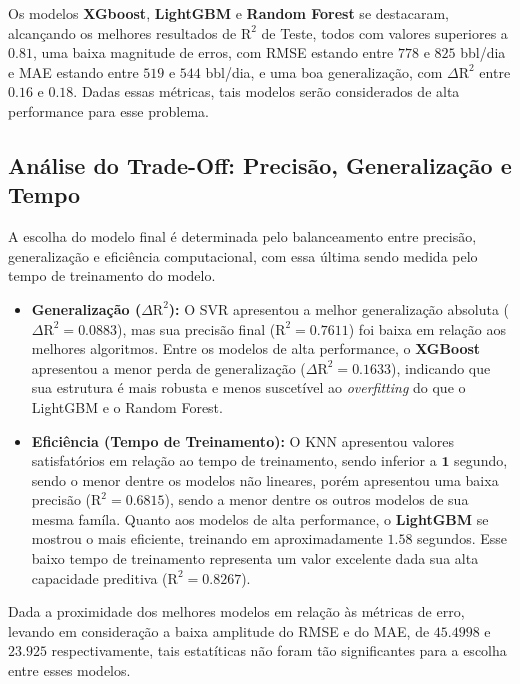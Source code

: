 Os modelos \textbf{XGboost}, \textbf{LightGBM} e \textbf{Random Forest} se destacaram, alcançando os melhores resultados de $\text{R}^2$ de Teste, todos com valores superiores a $0.81$, uma baixa magnitude de erros, com \gls{RMSE} estando entre $778$ e $825$ bbl/dia e \gls{MAE} estando entre $519$ e $544$ bbl/dia, e uma boa generalização, com $\Delta \text{R}^2$ entre $0.16$ e $0.18$. Dadas essas métricas, tais modelos serão considerados de alta performance para esse problema.

\subsection{Análise do Trade-Off: Precisão, Generalização e Tempo}

A escolha do modelo final é determinada pelo balanceamento entre precisão, generalização e eficiência computacional, com essa última sendo medida pelo tempo de treinamento do modelo.

\begin{itemize}
    \item \textbf{Generalização ($\Delta \text{R}^2$):} O \gls{SVR} apresentou a melhor generalização absoluta ($\Delta \text{R}^2 = 0.0883$), mas sua precisão final ($\text{R}^2=0.7611$) foi baixa em relação aos melhores algoritmos. Entre os modelos de alta performance, o \textbf{XGBoost} apresentou a menor perda de generalização ($\Delta \text{R}^2 = 0.1633$), indicando que sua estrutura é mais robusta e menos suscetível ao \textit{overfitting} do que o LightGBM e o Random Forest.
    
    \item \textbf{Eficiência (Tempo de Treinamento):} O \gls{KNN} apresentou valores satisfatórios em relação ao tempo de treinamento, sendo inferior a $\mathbf{1}$ segundo, sendo o menor dentre os modelos não lineares, porém apresentou uma baixa precisão ($\text{R}^2 = 0.6815$), sendo a menor dentre os outros modelos de sua mesma famíla. Quanto aos modelos de alta performance, o \textbf{LightGBM} se mostrou o mais eficiente, treinando em aproximadamente $\mathbf{1.58}$ segundos. Esse baixo tempo de treinamento representa um valor excelente dada sua alta capacidade preditiva ($\text{R}^2 = 0.8267$).
\end{itemize}

Dada a proximidade dos melhores modelos em relação às métricas de erro, levando em consideração a baixa amplitude do \gls{RMSE} e do \gls{MAE}, de $\mathbf{45.4998}$ e $\mathbf{23.925}$ respectivamente, tais estatíticas não foram tão significantes para a escolha entre esses modelos.


